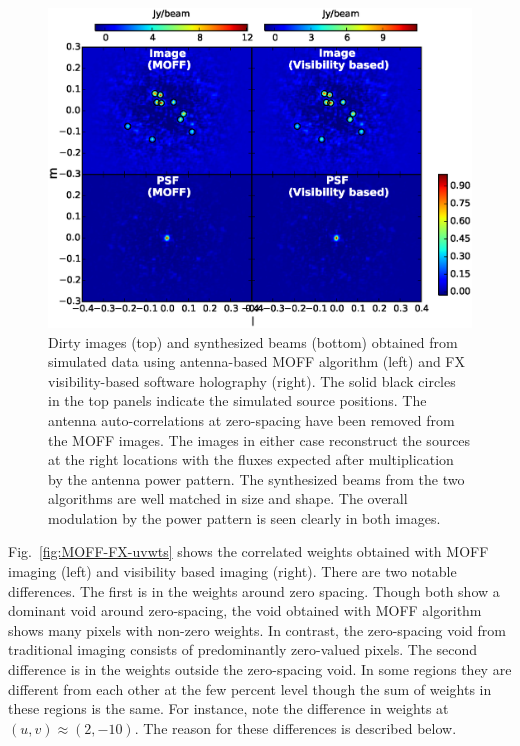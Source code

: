 \documentclass[a4paper,fleqn,usenatbib]{mnras}
\begin{document}
\begin{figure}
  \includegraphics[width=\columnwidth]{MOFF_FX_comparison_10_random_source_positions_4_iterations_test_aperture_zoomed}
  \caption{Dirty images (top) and synthesized beams (bottom) obtained from 
    simulated data using antenna-based MOFF algorithm (left) and FX 
    visibility-based software holography (right). The solid black circles in the
    top panels indicate the simulated source positions. The antenna 
    auto-correlations at zero-spacing have been removed from the MOFF images. 
    The images in either case reconstruct the sources at the right locations 
    with the fluxes expected after multiplication by the antenna power pattern. 
    The synthesized beams from the two algorithms are well matched in size and
    shape. The overall modulation by the power pattern is seen clearly in both
    images.}
  \label{fig:MOFF-FX-image}
\end{figure}

Fig.~\ref{fig:MOFF-FX-uvwts} shows the correlated weights obtained with MOFF 
imaging (left) and visibility based imaging (right). There are two notable 
differences. The first is in the weights around zero spacing. Though both show a
dominant void around zero-spacing, the void obtained with MOFF algorithm shows 
many pixels with non-zero weights. In contrast, the zero-spacing void from 
traditional imaging consists of predominantly zero-valued pixels. The second 
difference is in the weights outside the zero-spacing void. In some regions they 
are different from each other at the few percent level though the sum of weights 
in these regions is the same. For instance, note the difference in weights at 
$(u,v)\approx (2,-10)$. The reason for these differences is described below.
\end{document}
